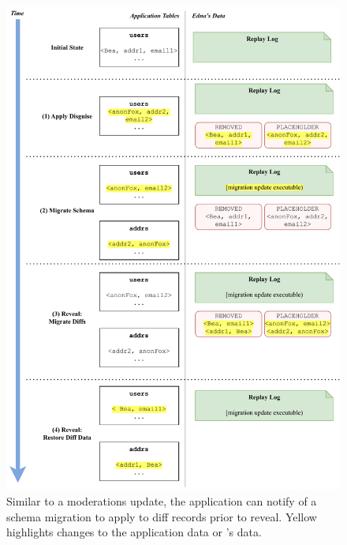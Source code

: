 \begin{figure}
    \centering
    \includegraphics[width=\textwidth]{figs/update-migration}
  \caption{Similar to a moderations update, the application can notify \sys of a
    schema migration to apply to diff records prior to reveal. Yellow 
    highlights changes to the application data or \sys's data.}
\label{f:update:schema}
\end{figure}

